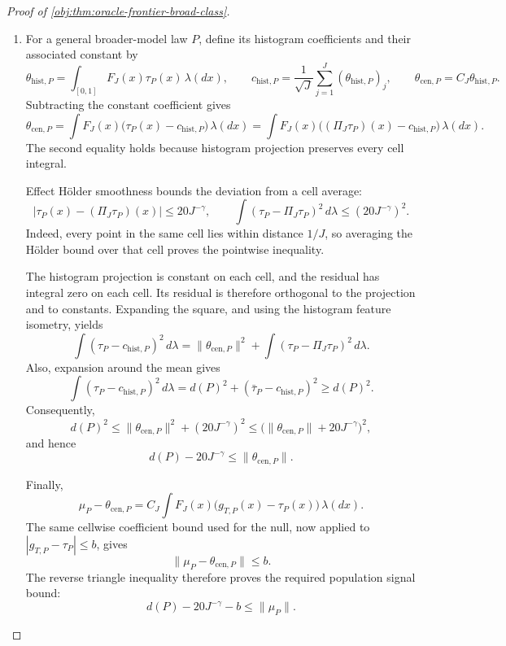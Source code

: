 \documentclass[11pt]{article}
\begin{document}
\begin{proof}[Proof of \cref{obj:thm:oracle-frontier-broad-class}]
\begin{enumerate}
\item For a general broader-model law \(P\), define its histogram coefficients and their associated constant by
\[
\theta_{\mathrm{hist},P}
=\int_{[0,1]}F_J(x)\tau_P(x)\,\lambda(dx),
\qquad
c_{\mathrm{hist},P}
=\frac1{\sqrt J}\sum_{j=1}^J(\theta_{\mathrm{hist},P})_j,
\qquad
\theta_{\mathrm{cen},P}=C_J\theta_{\mathrm{hist},P}.
\]
Subtracting the constant coefficient gives
\[
\theta_{\mathrm{cen},P}
=\int F_J(x)\bigl(\tau_P(x)-c_{\mathrm{hist},P}\bigr)\,\lambda(dx)
=\int F_J(x)\bigl((\Pi_J\tau_P)(x)-c_{\mathrm{hist},P}\bigr)\,\lambda(dx).
\]
The second equality holds because histogram projection preserves every cell integral.

Effect Hölder smoothness bounds the deviation from a cell average:
\[
|\tau_P(x)-(\Pi_J\tau_P)(x)|
\le20J^{-\gamma},
\qquad
\int(\tau_P-\Pi_J\tau_P)^2\,d\lambda
\le(20J^{-\gamma})^2.
\]
Indeed, every point in the same cell lies within distance \(1/J\), so averaging the Hölder bound over that cell proves the pointwise inequality.

The histogram projection is constant on each cell, and the residual has integral zero on each cell. Its residual is therefore orthogonal to the projection and to constants. Expanding the square, and using the histogram feature isometry, yields
\[
\int(\tau_P-c_{\mathrm{hist},P})^2\,d\lambda
=
\|\theta_{\mathrm{cen},P}\|^2
+\int(\tau_P-\Pi_J\tau_P)^2\,d\lambda.
\]
Also, expansion around the mean gives
\[
\int(\tau_P-c_{\mathrm{hist},P})^2\,d\lambda
=d(P)^2+(\bar\tau_P-c_{\mathrm{hist},P})^2
\ge d(P)^2.
\]
Consequently,
\[
d(P)^2
\le\|\theta_{\mathrm{cen},P}\|^2+(20J^{-\gamma})^2
\le\bigl(\|\theta_{\mathrm{cen},P}\|+20J^{-\gamma}\bigr)^2,
\]
and hence
\[
d(P)-20J^{-\gamma}\le\|\theta_{\mathrm{cen},P}\|.
\]

Finally,
\[
\mu_P-\theta_{\mathrm{cen},P}
=C_J\int F_J(x)\bigl(g_{T,P}(x)-\tau_P(x)\bigr)\,\lambda(dx).
\]
The same cellwise coefficient bound used for the null, now applied to
\(|g_{T,P}-\tau_P|\le b\), gives
\[
\|\mu_P-\theta_{\mathrm{cen},P}\|\le b.
\]
The reverse triangle inequality therefore proves the required population signal bound:
\[
d(P)-20J^{-\gamma}-b\le\|\mu_P\|.
\]


\end{enumerate}
\end{proof}
\end{document}
